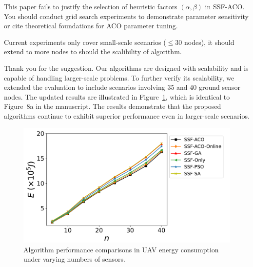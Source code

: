 \reviewer

\begin{revcomment}
	This paper fails to justify the selection of heuristic factors $(\alpha, \beta)$ in SSF-ACO. You should conduct grid search experiments to demonstrate parameter sensitivity or cite theoretical foundations for ACO parameter tuning.
\end{revcomment}
\begin{revresponse}

\end{revresponse}

\begin{revcomment}
	Current experiments only cover small-scale scenarios ($\leq 30$ nodes), it should extend to more nodes to should the scalibility of algorithm.
\end{revcomment}
\begin{revresponse}
	Thank you for the suggestion.
	Our algorithms are designed with scalability and is capable of handling larger-scale problems.
	To further verify its scalability, we extended the evaluation to include scenarios involving 35 and 40 ground sensor nodes. The updated results are illustrated in Figure~\ref{fig:40nodes}, which is identical to Figure~8a in the manuscript. The results demonstrate that the proposed algorithms continue to exhibit superior performance even in larger-scale scenarios.
	\begin{figure}[h]
		\centerline{\includegraphics[width=.6\textwidth]{fig/exp_number_40_legend.pdf}}
		\caption{Algorithm performance comparisons in UAV energy consumption under varying numbers of sensors.}
		\label{fig:40nodes}
	\end{figure}
\end{revresponse}


